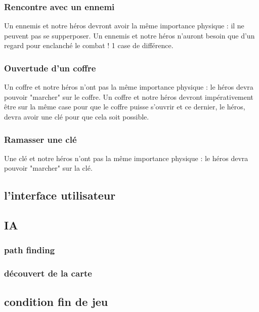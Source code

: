 \documentclass[a4paper 12pts]{article}
\begin{document}
\subsubsection {Rencontre avec un ennemi} 
Un ennemis et notre héros devront avoir la même importance physique : il ne peuvent pas se supperposer.
Un ennemis et notre héros n'auront besoin que d'un regard pour enclanché le combat ! 1 case de différence.


\subsubsection {Ouvertude d'un coffre}
Un coffre et notre héros n'ont pas la même importance physique : le héros devra pouvoir "marcher" sur le coffre.
Un coffre et notre héros devront impérativement être sur la même case pour que le coffre puisse s'ouvrir et ce dernier, 
le héros, devra avoir une clé pour que cela soit possible.


\subsubsection {Ramasser une clé}
Une clé et notre héros n'ont pas la même importance physique : le héros devra pouvoir "marcher" sur la clé.

 
\subsection{l'interface utilisateur}

\subsection{IA}

\subsubsection{path finding}

\subsubsection{découvert de la carte}

\subsection{condition fin de jeu}
\end{document}
